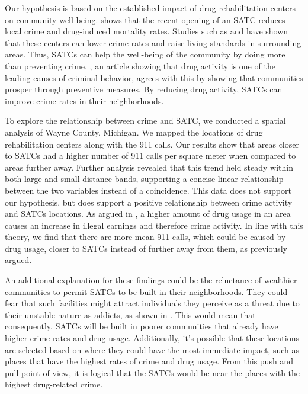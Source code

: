 \documentclass[12pt]{article}
\begin{document}
Our hypothesis is based on the established impact of drug rehabilitation centers on community well-being. \cite{SAT_centers_and_crime} shows that the recent opening of an SATC reduces local crime and drug-induced mortality rates. Studies such as \cite{drugs_and_crime}
and \cite{mental_healthcare_and_crime}  have shown that these centers can lower crime rates and raise living standards in surrounding areas. Thus, SATCs can help the well-being of the community by doing more than preventing crime. \cite{drugs_crime_space_time}, an article showing that drug activity is one of the leading causes of criminal behavior, agrees with this by showing that communities prosper through preventive measures. By reducing drug activity, SATCs can improve crime rates in their neighborhoods. 

To explore the relationship between crime and SATC, we conducted a spatial analysis of Wayne County, Michigan. We mapped the locations of drug rehabilitation centers along with the 911 calls. Our results show that areas closer to SATCs had a higher number of 911 calls per square meter when compared to areas further away. Further analysis revealed that this trend held steady within both large and small distance bands, supporting a concise linear relationship between the two variables instead of a coincidence. This data does not support our hypothesis, but does support a positive relationship between crime activity and SATCs locations. As argued in \cite{Socioeconomic-Determinants}, a higher amount of drug usage in an area causes an increase in illegal earnings and therefore crime activity. In line with this theory, we find that there are more mean 911 calls, which could be caused by drug usage, closer to SATCs instead of further away from them, as previously argued. 

An additional explanation for these findings could be the reluctance of wealthier communities to permit SATCs to be built in their neighborhoods. They could fear that such facilities might attract individuals they perceive as a threat due to their unstable nature as addicts, as shown in \cite{mental_health_and_disability}. This would mean that consequently, SATCs will be built in poorer communities that already have higher crime rates and drug usage. Additionally, it's possible that these locations are selected based on where they could have the most immediate impact, such as places that have the highest rates of crime and drug usage. From this push and pull point of view, it is logical that the SATCs would be near the places with the highest drug-related crime.
\end{document}
